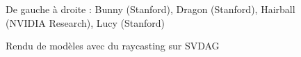 \documentclass[12pt,a4paper,twoside]{article}
\begin{document}
    \begin{figure}[H]
        \centering
        \caption{Rendu de modèles avec du raycasting sur SVDAG}
        \begin{center}
            De gauche à droite : Bunny (Stanford), Dragon (Stanford), Hairball (NVIDIA Research), Lucy (Stanford)
        \end{center}
        \label{models}
    \end{figure}
\end{document}
